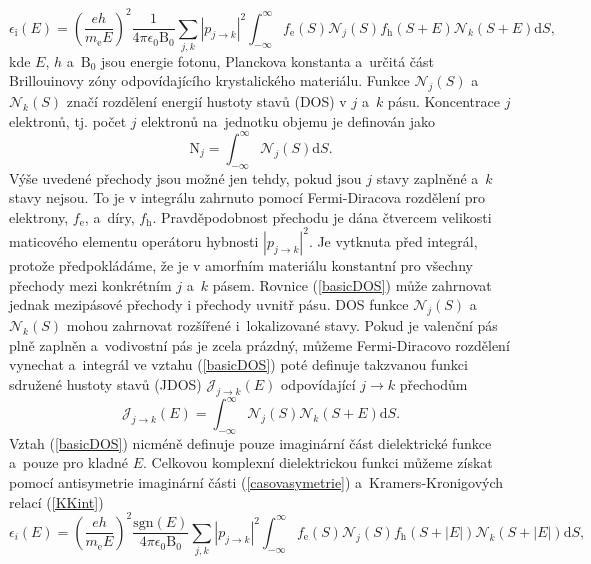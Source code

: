 \begin{equation}
\label{basicDOS}
\epsilon_\mathrm{i} (E) = 
\left(\frac{eh}{m_\mathrm{e}E} \right)^2 \frac{1}{4 \pi \epsilon_0 \mathrm{B}_0} \sum_{j,k} | p_{j \rightarrow k} |^2
\int_{-\infty}^\infty f_\mathrm{e}(S) \mathcal{N}_j(S) f_\mathrm{h}(S+E) \mathcal{N}_k(S + E)\mathrm{d}S \text{,}
\end{equation}
kde $E$, $h$ a~$\mathrm{B}_0$ jsou energie fotonu, Planckova konstanta a~určitá část Brillouinovy zóny odpovídajícího krystalického materiálu. Funkce $\mathcal{N}_j(S)$ a~$\mathcal{N}_k(S)$ značí rozdělení energií hustoty stavů (DOS) v $j$ a~$k$ pásu. Koncentrace $j$ elektronů, tj. počet $j$ elektronů na~jednotku objemu je definován jako
\begin{equation}
\mathrm{N}_j = \int_{-\infty}^\infty \mathcal{N}_j(S)\mathrm{d}S \text{.}
\end{equation}
Výše uvedené přechody jsou možné jen tehdy, pokud jsou $j$ stavy zaplněné a~$k$ stavy nejsou. To je v integrálu zahrnuto pomocí Fermi-Diracova rozdělení pro elektrony, $f_\mathrm{e}$, a~díry, $f_\mathrm{h}$. Pravděpodobnost přechodu je dána čtvercem velikosti maticového elementu operátoru hybnosti $|p_{j \rightarrow k}|^2$. Je vytknuta před integrál, protože předpokládáme, že je v amorfním materiálu konstantní pro všechny přechody mezi konkrétním $j$ a~$k$ pásem. Rovnice (\ref{basicDOS}) může zahrnovat jednak mezipásové přechody i přechody uvnitř pásu. DOS funkce $\mathcal{N}_j(S)$ a~$\mathcal{N}_k(S)$ mohou zahrnovat rozšířené i~lokalizované stavy. Pokud je valenční pás plně zaplněn a~vodivostní pás je zcela prázdný, můžeme Fermi-Diracovo rozdělení vynechat a~integrál ve vztahu (\ref{basicDOS}) poté definuje takzvanou funkci sdružené hustoty stavů (JDOS) $\mathcal{J}_{j \rightarrow k}(E)$ odpovídající $j \rightarrow k$ přechodům
\begin{equation}
\mathcal{J}_{j \rightarrow k}(E) = \int_{-\infty}^\infty \mathcal{N}_j(S) \mathcal{N}_k(S + E)\mathrm{d}S \text{.}
\end{equation}
Vztah (\ref{basicDOS}) nicméně definuje pouze imaginární část dielektrické funkce a~pouze pro kladné $E$. Celkovou komplexní dielektrickou funkci můžeme získat pomocí antisymetrie imaginární části (\ref{casovasymetrie}) a~Kramers-Kronigových relací (\ref{KKint})
\begin{equation}
\label{basicDLC2}
\epsilon_i (E) = 
\left(\frac{eh}{m_\mathrm{e}E} \right)^2 \frac{\mathrm{sgn}(E)}{4 \pi \epsilon_0 \mathrm{B}_0} \sum_{j,k} | p_{j \rightarrow k} |^2
\int_{-\infty}^\infty f_\mathrm{e}(S) \mathcal{N}_j(S) f_\mathrm{h}(S+|E|) \mathcal{N}_k(S + |E|)\mathrm{d}S \text{,}
\end{equation}

